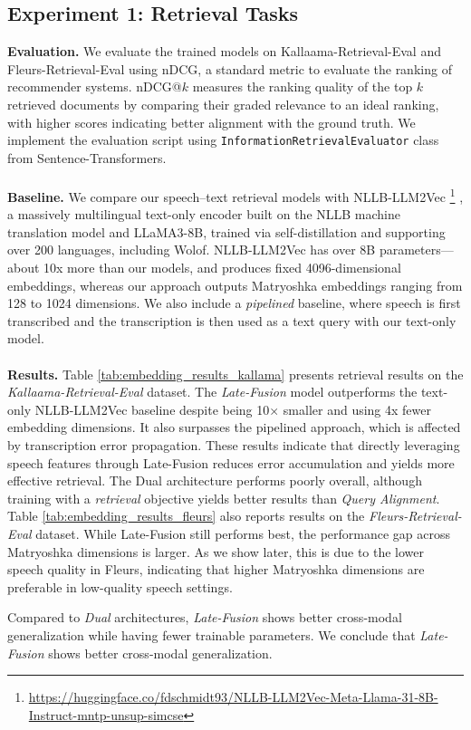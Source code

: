 \documentclass[11pt]{article}
\newcommand{\myparagraph}[1]{\noindent\textbf{#1}}
\begin{document}
\subsection{Experiment 1: Retrieval Tasks}
\myparagraph{Evaluation.} We evaluate the trained models on Kallaama-Retrieval-Eval and Fleurs-Retrieval-Eval using nDCG, a standard metric to evaluate the ranking of recommender systems. 
nDCG@$k$ measures the ranking quality of the top $k$ retrieved documents by comparing their graded relevance to an ideal ranking, with higher scores indicating better alignment with the ground truth.
We implement the evaluation script using \texttt{InformationRetrievalEvaluator} class from Sentence-Transformers.
\\
\\
\myparagraph{Baseline.} We compare our speech–text retrieval models with NLLB-LLM2Vec \citep{nllbllm2vec}\footnote{{\tiny \url{https://huggingface.co/fdschmidt93/NLLB-LLM2Vec-Meta-Llama-31-8B-Instruct-mntp-unsup-simcse}}}
, a massively multilingual text-only encoder built on the NLLB machine translation model and LLaMA3-8B, trained via self-distillation and supporting over 200 languages, including Wolof. NLLB-LLM2Vec has over 8B parameters—about 10x more than our models, and produces fixed 4096-dimensional embeddings, whereas our approach outputs Matryoshka embeddings ranging from 128 to 1024 dimensions. We also include a \textit{pipelined} baseline, where speech is first transcribed and the transcription is then used as a text query with our text-only model.
\\
\\
\myparagraph{Results.} Table \ref{tab:embedding_results_kallama} presents retrieval results on the \textit{Kallaama-Retrieval-Eval} dataset. The \textit{Late-Fusion} model outperforms the text-only NLLB-LLM2Vec baseline despite being 10× smaller and using 4x fewer embedding dimensions. It also surpasses the pipelined approach, which is affected by transcription error propagation. These results indicate that directly leveraging speech features through Late-Fusion reduces error accumulation and yields more effective retrieval. The Dual architecture performs poorly overall, although training with a \textit{retrieval} objective yields better results than \textit{Query Alignment}. Table \ref{tab:embedding_results_fleurs} also reports results on the \textit{Fleurs-Retrieval-Eval} dataset. While Late-Fusion still performs best, the performance gap across Matryoshka dimensions is larger. As we show later, this is due to the lower speech quality in Fleurs, indicating that higher Matryoshka dimensions are preferable in low-quality speech settings.
\begin{tcolorbox}[compactbox,colback=violet!15!white,colframe=violet!100!white,title={\color{black} \textbf{Finding 1}: \textit{Late-Fusion} overcomes \textit{Dual} architectures for fast cross-modal adaptation}]
Compared to \textit{Dual} architectures, \textit{Late-Fusion} shows better cross-modal generalization while having fewer trainable parameters. We conclude that \textit{Late-Fusion} shows better cross-modal generalization.
\end{tcolorbox}
\end{document}
